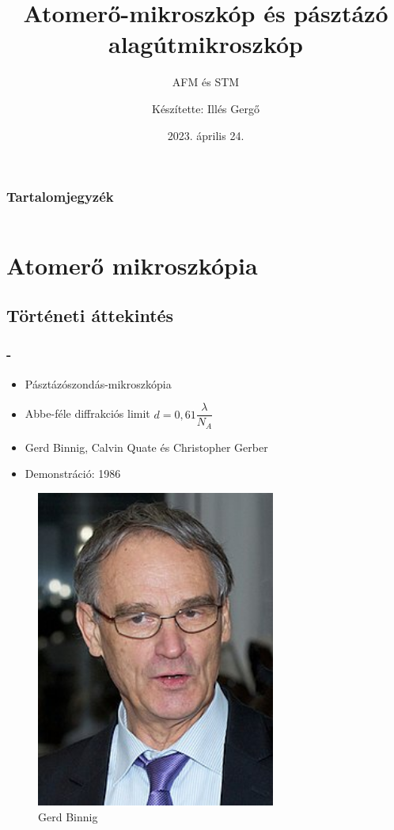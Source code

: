 \documentclass[aspectratio=169]{beamer}
\begin{document}
\title{Atomerő-mikroszkóp és pásztázó alagútmikroszkóp}
\subtitle{AFM és STM}
\author{Készítette: Illés Gergő}
\date{2023. április 24.}
\begin{frame}
\maketitle
\end{frame}
\begin{frame}
\frametitle{Tartalomjegyzék}

\begin{columns}
\tableofcontents
\end{columns}
\end{frame}

\section{Atomerő mikroszkópia}
\subsection{Történeti áttekintés}
\begin{frame}
\frametitle{\secname{} - \subsecname}
\begin{minipage}[m]{0.63\linewidth}
\begin{itemize}
\item Pásztázószondás-mikroszkópia
\item Abbe-féle diffrakciós limit $d=0,61\dfrac{\lambda}{N_A}$
\item Gerd Binnig, Calvin Quate és Christopher Gerber
\item Demonstráció: 1986
\end{itemize}
\end{minipage}
\hfill
\begin{minipage}[m]{0.36\linewidth}
\begin{figure}
\includegraphics[width=0.7\textwidth]{gerd.jpg}
\caption{Gerd Binnig}
\end{figure}
\end{minipage}
\end{frame}
\end{document}
